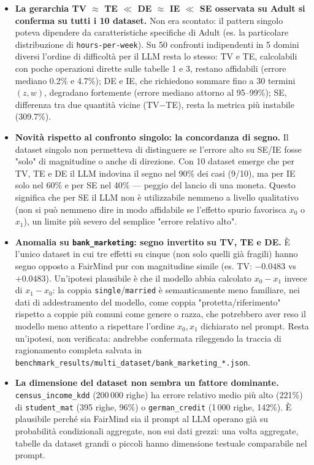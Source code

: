 \begin{itemize}
  \item \textbf{La gerarchia TV $\approx$ TE $\ll$ DE $\approx$ IE $\ll$ SE osservata su Adult si conferma su tutti i 10 dataset.} Non era scontato: il pattern singolo poteva dipendere da caratteristiche specifiche di Adult (es. la particolare distribuzione di \texttt{hours-per-week}). Su 50 confronti indipendenti in 5 domini diversi l'ordine di difficolt\`a per il LLM resta lo stesso: TV e TE, calcolabili con poche operazioni dirette sulle tabelle 1 e 3, restano affidabili (errore mediano 0.2\% e 4.7\%); DE e IE, che richiedono sommare fino a 30 termini $(z,w)$, degradano fortemente (errore mediano attorno al 95--99\%); SE, differenza tra due quantit\`a vicine (TV$-$TE), resta la metrica pi\`u instabile (309.7\%).

  \item \textbf{Novit\`a rispetto al confronto singolo: la concordanza di segno.} Il dataset singolo non permetteva di distinguere se l'errore alto su SE/IE fosse "solo" di magnitudine o anche di direzione. Con 10 dataset emerge che per TV, TE e DE il LLM indovina il segno nel 90\% dei casi (9/10), ma per IE solo nel 60\% e per SE nel 40\% --- peggio del lancio di una moneta. Questo significa che per SE il LLM non \`e utilizzabile nemmeno a livello qualitativo (non si pu\`o nemmeno dire in modo affidabile se l'effetto spurio favorisca $x_0$ o $x_1$), un limite pi\`u severo del semplice "errore relativo alto".

  \item \textbf{Anomalia su \texttt{bank\_marketing}: segno invertito su TV, TE e DE.} \`E l'unico dataset in cui tre effetti su cinque (non solo quelli gi\`a fragili) hanno segno opposto a FairMind pur con magnitudine simile (es. TV: $-0.0483$ vs $+0.0483$). Un'ipotesi plausibile \`e che il modello abbia calcolato $x_0 - x_1$ invece di $x_1 - x_0$: la coppia \texttt{single}/\texttt{married} \`e semanticamente meno familiare, nei dati di addestramento del modello, come coppia "protetta/riferimento" rispetto a coppie pi\`u comuni come genere o razza, che potrebbero aver reso il modello meno attento a rispettare l'ordine $x_0, x_1$ dichiarato nel prompt. Resta un'ipotesi, non verificata: andrebbe confermata rileggendo la traccia di ragionamento completa salvata in \texttt{benchmark\_results/multi\_dataset/bank\_marketing\_*.json}.

  \item \textbf{La dimensione del dataset non sembra un fattore dominante.} \texttt{census\_income\_kdd} (200\,000 righe) ha errore relativo medio pi\`u alto (221\%) di \texttt{student\_mat} (395 righe, 96\%) o \texttt{german\_credit} (1\,000 righe, 142\%). \`E plausibile perch\'e sia FairMind sia il prompt al LLM operano gi\`a su probabilit\`a condizionali aggregate, non sui dati grezzi: una volta aggregate, tabelle da dataset grandi o piccoli hanno dimensione testuale comparabile nel prompt.


\end{itemize}
